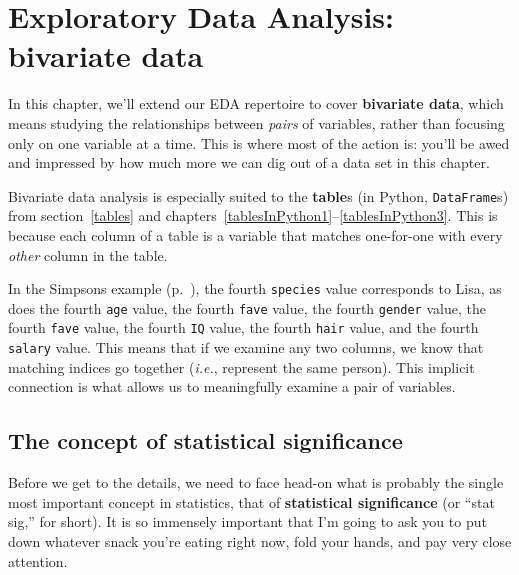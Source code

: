 
\chapter{Exploratory Data Analysis: bivariate data}
\label{ch:edaBivariate}


In this chapter, we'll extend our EDA repertoire to cover \textbf{bivariate
data}, which means studying the relationships between \textit{pairs} of
variables, rather than focusing only on one variable at a time. This is where
most of the action is: you'll be awed and impressed by how much more we can dig
out of a data set in this chapter.


Bivariate data analysis is especially suited to the \textbf{table}s (in Python,
\texttt{DataFrame}s) from section~\ref{tables} and
chapters~\ref{tablesInPython1}--\ref{tablesInPython3}. This is because each
column of a table is a variable that matches one-for-one with every
\textit{other} column in the table.


In the Simpsons example (p.~\pageref{finalSimpsons}), the fourth
\texttt{species} value corresponds to Lisa, as does the fourth \texttt{age}
value, the fourth \texttt{fave} value, the fourth \texttt{gender} value,
the fourth \texttt{fave} value, the fourth \texttt{IQ} value, the fourth
\texttt{hair} value, and the fourth \texttt{salary} value. This means that if
we examine any two columns, we know that matching indices go together
(\textit{i.e.}, represent the same person). This implicit connection is what
allows us to meaningfully examine a pair of variables.

\section{The concept of statistical significance}


Before we get to the details, we need to face head-on what is probably the
single most important concept in statistics, that of \textbf{statistical
significance} (or ``stat sig,'' for short). It is so immensely important that
I'm going to ask you to put down whatever snack you're eating right now, fold
your hands, and pay very close attention.


